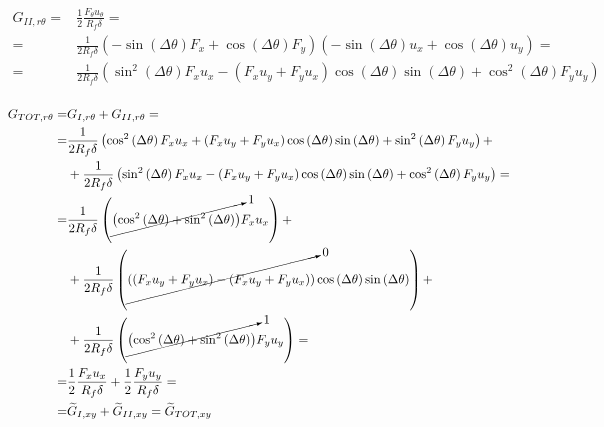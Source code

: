 \documentclass[a4paper]{jpconf}
\begin{document}
\begin{equation}
\begin{split}
G_{II,r\theta} = &\frac{1}{2}\frac{F_{\theta}u_{\theta}}{R_{f}\delta}=\\
= &\frac{1}{2R_{f}\delta}\left(-\sin\left(\Delta\theta\right) F_{x}+\cos\left(\Delta\theta\right)F_{y}\right)\left(-\sin\left(\Delta\theta\right) u_{x}+\cos\left(\Delta\theta\right) u_{y}\right)=\\
= &\frac{1}{2R_{f}\delta}\left(\sin^{2}\left(\Delta\theta\right) F_{x}u_{x}-\left(F_{x}u_{y}+F_{y}u_{x}\right)\cos\left(\Delta\theta\right)\sin\left(\Delta\theta\right)+\cos^{2}\left(\Delta\theta\right)F_{y}u_{y}\right)\\
\end{split}
\end{equation}

\begin{equation}
\begin{split}
G_{TOT,r\theta} = &G_{I,r\theta} + G_{II,r\theta}=\\
= &\frac{1}{2R_{f}\delta}\left(\cos^{2}\left(\Delta\theta\right) F_{x}u_{x}+\left(F_{x}u_{y}+F_{y}u_{x}\right)\cos\left(\Delta\theta\right)\sin\left(\Delta\theta\right)+\sin^{2}\left(\Delta\theta\right)F_{y}u_{y}\right)+\\
&+ \frac{1}{2R_{f}\delta}\left(\sin^{2}\left(\Delta\theta\right) F_{x}u_{x}-\left(F_{x}u_{y}+F_{y}u_{x}\right)\cos\left(\Delta\theta\right)\sin\left(\Delta\theta\right)+\cos^{2}\left(\Delta\theta\right)F_{y}u_{y}\right)=\\
=&\frac{1}{2R_{f}\delta}\left(\cancelto{1}{\left(\cos^{2}\left(\Delta\theta\right)+\sin^{2}\left(\Delta\theta\right)\right)}F_{x}u_{x}\right)+\\
&+\frac{1}{2R_{f}\delta}\left(\cancelto{0}{\left(\left(F_{x}u_{y}+F_{y}u_{x}\right)-\left(F_{x}u_{y}+F_{y}u_{x}\right)\right)}\cos\left(\Delta\theta\right)\sin\left(\Delta\theta\right)\right)+\\
&+\frac{1}{2R_{f}\delta}\left(\cancelto{1}{\left(\cos^{2}\left(\Delta\theta\right)+\sin^{2}\left(\Delta\theta\right)\right)}F_{y}u_{y}\right)=\\
=&\frac{1}{2}\frac{F_{x}u_{x}}{R_{f}\delta}+\frac{1}{2}\frac{F_{y}u_{y}}{R_{f}\delta}=\\
=&\widetilde{G}_{I,xy} + \widetilde{G}_{II,xy}=\widetilde{G}_{TOT,xy}
\end{split}
\end{equation}
\end{document}
